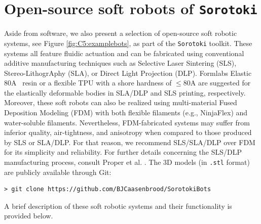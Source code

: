 \section{Open-source soft robots of \texttt{Sorotoki}}
Aside from software, we also present a selection of open-source soft robotic systems,  see Figure \ref{fig:C5:examplebots}, as part of the \texttt{Sorotoki} toolkit. These systems all feature fluidic actuation and can be fabricated using conventional additive manufacturing techniques such as Selective Laser Sintering (SLS), Stereo-LithogrAphy (SLA), or Direct Light Projection (DLP). Formlabs Elastic 80A\texttrademark
\, resin or a flexible TPU with a shore hardness of $\le 80$A are suggested for the elastically deformable bodies in SLA/DLP and SLS printing, respectively. Moreover, these soft robots can also be realized using multi-material Fused Deposition Modeling (FDM) with both flexible filaments (e.g., NinjaFlex) and water-soluble filaments. Nevertheless, FDM-fabricated systems may suffer from inferior quality, air-tightness, and anisotropy when compared to those produced by SLS or SLA/DLP. For that reason, we recommend SLS/SLA/DLP over FDM for its simplicity and reliability. For further details concerning the SLS/DLP manufacturing process, consult Proper et al. \cite{Proper2023}. The 3D models (in \texttt{.stl} format) are publicly available through Git:
%
\begin{lstlisting}[style=terminal]
> git clone https://github.com/BJCaasenbrood/SorotokiBots
\end{lstlisting}
%
A brief description of these soft robotic systems and their functionality is provided below.
